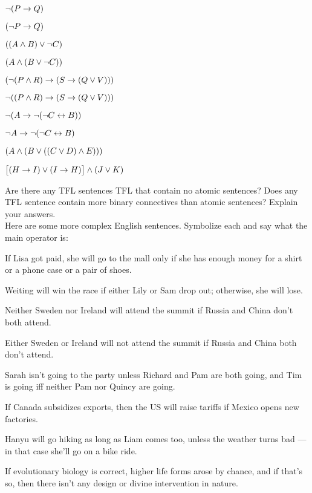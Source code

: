 \begin{earg}
\item $\neg (P \rightarrow Q)$
\item $(\neg P \rightarrow Q)$
\item $((A \wedge B) \vee \neg C)$
\item $(A \wedge (B \vee \neg C))$
\item $(\neg (P \wedge R) \rightarrow (S \rightarrow (Q \vee V)))$
\item$\neg ((P \wedge R) \rightarrow (S \rightarrow (Q \vee V)))$
\item $\neg(A \rightarrow \neg (\neg C \leftrightarrow B))$
\item $\neg A \rightarrow \neg (\neg C \leftrightarrow B)$
\item $(A \wedge (B \vee ((C \vee D) \wedge E)))$
\item $\bigl[(H \rightarrow I) \vee (I \rightarrow H)\bigr] \wedge (J \vee K)$
\end{earg}

\problempart
Are there any TFL sentences TFL that contain no atomic sentences? Does any TFL sentence contain more binary connectives than atomic sentences?  Explain your answers.\\

\problempart
Here are some more complex English sentences.   Symbolize each and say what the main operator is:


\begin{earg}

\item If Lisa got paid, she will go to the mall only if she has enough money for a shirt or a phone case or a pair of shoes.

\item Weiting will win the race if either Lily or Sam drop out; otherwise, she will lose.



\item Neither Sweden nor Ireland will attend the summit if Russia and China don't both attend.

\item Either Sweden or Ireland will not attend the summit if Russia and China both don't attend.

\item Sarah isn't going to the party unless Richard and Pam are both going, and Tim is
going iff neither Pam nor Quincy are going.

\item If Canada subsidizes exports, then the US will raise tariffs if Mexico opens new factories.


\item Hanyu will go hiking as long as Liam comes too, unless the weather turns bad --- in that case she'll go on a bike ride.

\item   If evolutionary biology is correct, higher life forms arose by  chance, and if that's so, then there isn't any design or divine intervention in nature.


\end{earg}




